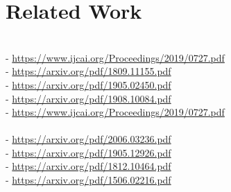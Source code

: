 \section{Related Work}
 \\
- \url{https://www.ijcai.org/Proceedings/2019/0727.pdf}\\
- \url{https://arxiv.org/pdf/1809.11155.pdf} \\
- \url{https://arxiv.org/pdf/1905.02450.pdf} \\
- \url{https://arxiv.org/pdf/1908.10084.pdf} \\
- \url{https://www.ijcai.org/Proceedings/2019/0727.pdf}\\
 \\
- \url{https://arxiv.org/pdf/2006.03236.pdf} \\
- \url{https://arxiv.org/pdf/1905.12926.pdf} \\
- \url{https://arxiv.org/pdf/1812.10464.pdf} \\
- \url{https://arxiv.org/pdf/1506.02216.pdf} \\


